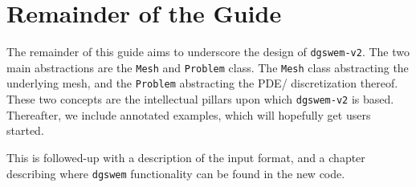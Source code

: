 \section{Remainder of the Guide}
The remainder of this guide aims to underscore the design of \texttt{dgswem-v2}. The two main abstractions are the \texttt{Mesh} and \texttt{Problem} class. The \texttt{Mesh} class abstracting the underlying mesh, and the \texttt{Problem} abstracting the PDE/ discretization thereof. These two concepts are the intellectual pillars upon which \texttt{dgswem-v2} is based. Thereafter, we include annotated examples, which will hopefully get users started.

This is followed-up with a description of the input format, and a chapter describing where \texttt{dgswem} functionality can be found in the new code.

